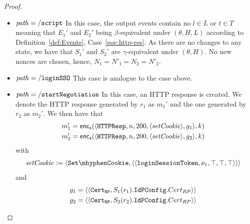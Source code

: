 \begin{proof}
    \begin{itemize}
      \item $\mathit{path} = \mathtt{/script}$ In this case, 
        the output events contain no $l\in L$ or $t\in T$ 
        meaning that $E_1'$ and $E_2'$ being $\beta$-equivalent
        under $(\theta,H,L)$ according to 
        Definition~\ref{def:Events}, Case~\ref{eqe:http-res}. As
        there are no changes to any state, we have that $S_1'$ 
        and $S_2'$ are $\gamma$-equivalent under $(\theta,H)$. 
        No new nonces are chosen, hence, 
        $N_1 = N'_1 = N_2 = N'_2$.
      \item $\mathit{path} = \mathtt{/loginSSO}$ This case is analogue
        to the case above.
      \item $\mathit{path} = \mathtt{/startNegotiation}$ In this case, 
        an HTTP response is created. We denote the HTTP response generated by $r_1$ as $m_1'$ and the one
        generated by $r_2$ as $m_2'$. We then have that
        \begin{align*}
          m_1' = \mathsf{enc}_\mathsf{s}(\langle\mathtt{HTTPResp},n,200,\langle\mathit{setCookie}\rangle,g_1\rangle,k) \\
          m_2' = \mathsf{enc}_\mathsf{s}(\langle\mathtt{HTTPResp},n,200,\langle\mathit{setCookie}\rangle,g_2\rangle,k)
        \end{align*}
        with
        \begin{align*}
          \mi{setCookie} := \myangle{\cSetCookie, \myangle{\myangle{\str{loginSessionToken}, \nu_1, \True, \True, \True}}} \\
        \end{align*}
        and 
        \begin{align*}
          g_1 = \langle\langle\mathtt{Cert_{RP}},S_1(r_1).\mathtt{IdPConfig}.Cert_{RP}\rangle\rangle \\
          g_2 = \langle\langle\mathtt{Cert_{RP}},S_2(r_2).\mathtt{IdPConfig}.Cert_{RP}\rangle\rangle
        \end{align*}
  

\end{itemize}
\end{proof}

